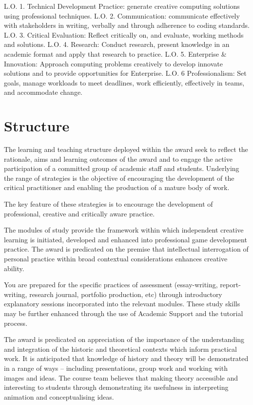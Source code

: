 L.O. 1. Technical Development Practice: generate creative computing solutions using professional techniques.
L.O. 2. Communication: communicate effectively with stakeholders in writing, verbally and through adherence to coding standards.
L.O. 3. Critical Evaluation: Reflect critically on, and evaluate, working methods and solutions.
L.O. 4. Research: Conduct research, present knowledge in an academic format and apply that research to practice.
L.O. 5. Enterprise \& Innovation: Approach computing problems creatively to develop innovate solutions and to provide opportunities for Enterprise.
L.O. 6 Professionalism: Set goals, manage workloads to meet deadlines, work efficiently, effectively in teams, and accommodate change.

\section{Structure}

The learning and teaching structure deployed within the award seek to reflect the rationale, aims and learning outcomes of the award and to engage the active participation of a committed group of academic staff and students.  Underlying the range of strategies is the objective of encouraging the development of the critical practitioner and enabling the production of a mature body of work. 

The key feature of these strategies is to encourage the development of professional, creative and critically aware practice.  

The modules of study provide the framework within which independent creative learning is initiated, developed and enhanced into professional game development practice. The award is predicated on the premise that intellectual interrogation of personal practice within broad contextual considerations enhances creative ability.

You are prepared for the specific practices of assessment (essay-writing, report-writing, research journal, portfolio production, etc) through introductory explanatory sessions incorporated into the relevant modules. These study skills may be further enhanced through the use of Academic Support and the tutorial process. 

The award is predicated on appreciation of the importance of the understanding and integration of the historic and theoretical contexts which inform practical work. It is anticipated that knowledge of history and theory will be demonstrated in a range of ways – including presentations, group work and working with images and ideas. The course team believes that making theory accessible and interesting to students through demonstrating its usefulness in interpreting animation and conceptualising ideas. 

